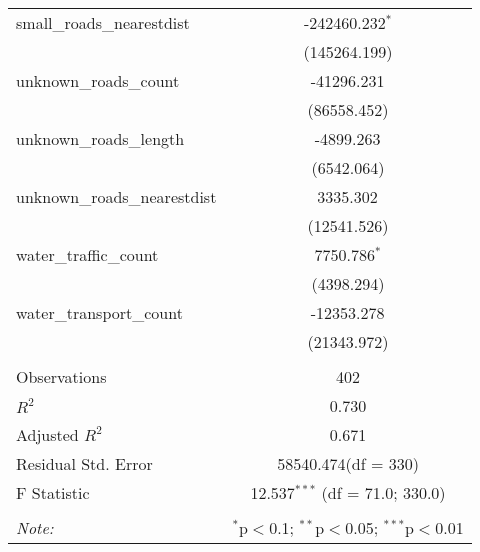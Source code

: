\begin{table}[!htbp]
\begin{tabular}{@{\extracolsep{5pt}}lc}
 small_roads_nearestdist & -242460.232$^{*}$ \\
  & (145264.199) \\
 unknown_roads_count & -41296.231$^{}$ \\
  & (86558.452) \\
 unknown_roads_length & -4899.263$^{}$ \\
  & (6542.064) \\
 unknown_roads_nearestdist & 3335.302$^{}$ \\
  & (12541.526) \\
 water_traffic_count & 7750.786$^{*}$ \\
  & (4398.294) \\
 water_transport_count & -12353.278$^{}$ \\
  & (21343.972) \\
\hline \\[-1.8ex]
 Observations & 402 \\
 $R^2$ & 0.730 \\
 Adjusted $R^2$ & 0.671 \\
 Residual Std. Error & 58540.474(df = 330)  \\
 F Statistic & 12.537$^{***}$ (df = 71.0; 330.0) \\
\hline
\hline \\[-1.8ex]
\textit{Note:} & \multicolumn{1}{r}{$^{*}$p$<$0.1; $^{**}$p$<$0.05; $^{***}$p$<$0.01} \\
\end{tabular}
\end{table}